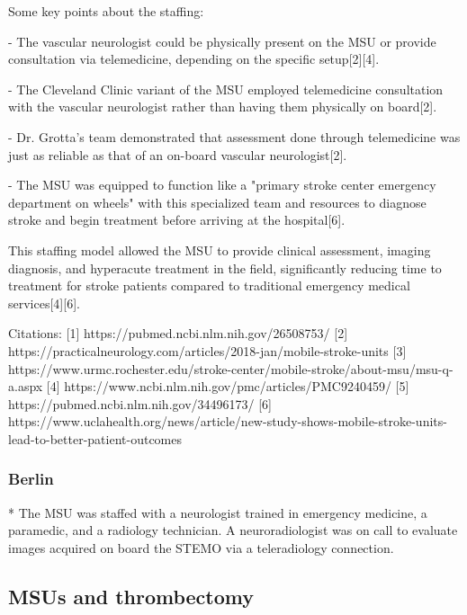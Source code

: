 Some key points about the staffing:

- The vascular neurologist could be physically present on the MSU or provide consultation via telemedicine, depending on the specific setup[2][4].

- The Cleveland Clinic variant of the MSU employed telemedicine consultation with the vascular neurologist rather than having them physically on board[2].

- Dr. Grotta's team demonstrated that assessment done through telemedicine was just as reliable as that of an on-board vascular neurologist[2].

- The MSU was equipped to function like a "primary stroke center emergency department on wheels" with this specialized team and resources to diagnose stroke and begin treatment before arriving at the hospital[6].

This staffing model allowed the MSU to provide clinical assessment, imaging diagnosis, and hyperacute treatment in the field, significantly reducing time to treatment for stroke patients compared to traditional emergency medical services[4][6].

Citations:
[1] https://pubmed.ncbi.nlm.nih.gov/26508753/
[2] https://practicalneurology.com/articles/2018-jan/mobile-stroke-units
[3] https://www.urmc.rochester.edu/stroke-center/mobile-stroke/about-msu/msu-q-a.aspx
[4] https://www.ncbi.nlm.nih.gov/pmc/articles/PMC9240459/
[5] https://pubmed.ncbi.nlm.nih.gov/34496173/
[6] https://www.uclahealth.org/news/article/new-study-shows-mobile-stroke-units-lead-to-better-patient-outcomes

\subsubsection{Berlin \cite{ebinger_effects_2015}}

* The MSU was staffed with a neurologist trained in emergency medicine, a
paramedic, and a radiology technician. A neuroradiologist was on call to evaluate images acquired on board the STEMO via a teleradiology connection.




\subsection{MSUs and thrombectomy}

